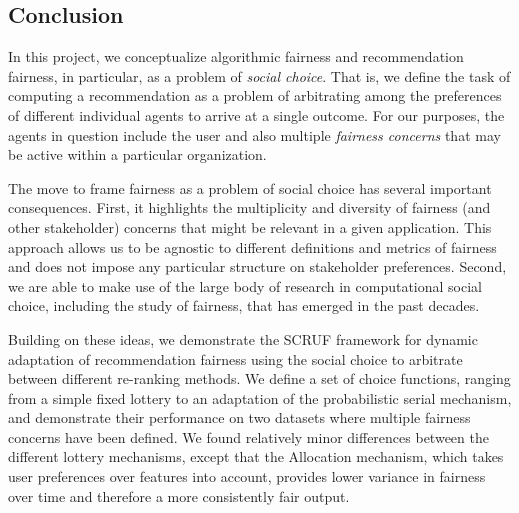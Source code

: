 \subsection{Conclusion}
In this project, we conceptualize algorithmic fairness and recommendation fairness, in particular, as a problem of \textit{social choice}. That is, we define the task of computing a recommendation as a problem of arbitrating among the preferences of different individual agents to arrive at a single outcome. For our purposes, the agents in question include the user and also multiple \textit{fairness concerns} that may be active within a particular organization. 

The move to frame fairness as a problem of social choice has several important consequences. First, it highlights the multiplicity and diversity of fairness (and other stakeholder) concerns that might be relevant in a given application. This approach allows us to be agnostic to different definitions and metrics of fairness and does not impose any particular structure on stakeholder preferences. Second, we are able to make use of the large body of research in computational social choice, including the study of fairness, that has emerged in the past decades. 

Building on these ideas, we demonstrate the SCRUF framework for dynamic adaptation of recommendation fairness using the social choice to arbitrate between different re-ranking methods. We define a set of choice functions, ranging from a simple fixed lottery to an adaptation of the probabilistic serial mechanism, and demonstrate their performance on two datasets where multiple fairness concerns have been defined. We found relatively minor differences between the different lottery mechanisms, except that the Allocation mechanism, which takes user preferences over features into account, provides lower variance in fairness over time and therefore a more consistently fair output.








